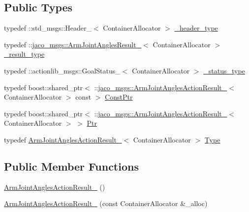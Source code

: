 \subsection*{Public Types}
\begin{DoxyCompactItemize}
\item 
typedef \+::std\+\_\+msgs\+::\+Header\+\_\+$<$ Container\+Allocator $>$ \hyperlink{structjaco__msgs_1_1ArmJointAnglesActionResult___a142970b220d568f61b0c132b07053d54}{\+\_\+header\+\_\+type}
\item 
typedef \+::\hyperlink{structjaco__msgs_1_1ArmJointAnglesResult__}{jaco\+\_\+msgs\+::\+Arm\+Joint\+Angles\+Result\+\_\+}$<$ Container\+Allocator $>$ \hyperlink{structjaco__msgs_1_1ArmJointAnglesActionResult___a50db46393a0ea3c38ea8de5debd933c7}{\+\_\+result\+\_\+type}
\item 
typedef \+::actionlib\+\_\+msgs\+::\+Goal\+Status\+\_\+$<$ Container\+Allocator $>$ \hyperlink{structjaco__msgs_1_1ArmJointAnglesActionResult___a55b4d92b3d825dc61be7afb680264c3d}{\+\_\+status\+\_\+type}
\item 
typedef boost\+::shared\+\_\+ptr$<$ \+::\hyperlink{structjaco__msgs_1_1ArmJointAnglesActionResult__}{jaco\+\_\+msgs\+::\+Arm\+Joint\+Angles\+Action\+Result\+\_\+}$<$ Container\+Allocator $>$ const  $>$ \hyperlink{structjaco__msgs_1_1ArmJointAnglesActionResult___ab3afdaea077adcf14e033cacd0cfedf8}{Const\+Ptr}
\item 
typedef boost\+::shared\+\_\+ptr$<$ \+::\hyperlink{structjaco__msgs_1_1ArmJointAnglesActionResult__}{jaco\+\_\+msgs\+::\+Arm\+Joint\+Angles\+Action\+Result\+\_\+}$<$ Container\+Allocator $>$ $>$ \hyperlink{structjaco__msgs_1_1ArmJointAnglesActionResult___ad7fc9c910324c1e966afa2f7962d1d25}{Ptr}
\item 
typedef \hyperlink{structjaco__msgs_1_1ArmJointAnglesActionResult__}{Arm\+Joint\+Angles\+Action\+Result\+\_\+}$<$ Container\+Allocator $>$ \hyperlink{structjaco__msgs_1_1ArmJointAnglesActionResult___afe31dc82574f7e5e57a0de66b2f68750}{Type}
\end{DoxyCompactItemize}
\subsection*{Public Member Functions}
\begin{DoxyCompactItemize}
\item 
\hyperlink{structjaco__msgs_1_1ArmJointAnglesActionResult___af9c3aa2fd22187c85149a9495205981a}{Arm\+Joint\+Angles\+Action\+Result\+\_\+} ()
\item 
\hyperlink{structjaco__msgs_1_1ArmJointAnglesActionResult___a7d94260d27f47218564d43837a310779}{Arm\+Joint\+Angles\+Action\+Result\+\_\+} (const Container\+Allocator \&\+\_\+alloc)
\end{DoxyCompactItemize}
